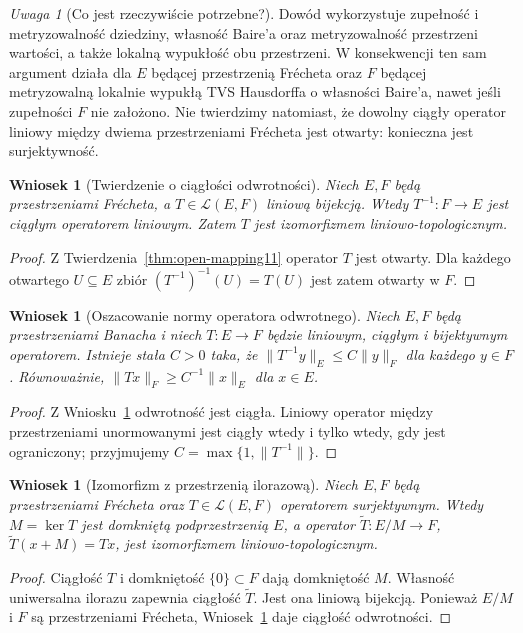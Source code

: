 \documentclass[11pt,a4paper]{article}
\numberwithin{equation}{section}
\theoremstyle{plain}
\newtheorem{wniosek}[twierdzenie]{Wniosek}
\theoremstyle{definition}
\theoremstyle{remark}
\newtheorem{uwaga}[twierdzenie]{Uwaga}
\begin{document}
\begin{uwaga}[Co jest rzeczywiście potrzebne?]\label{rem:open-assumptions11}
Dowód wykorzystuje zupełność i metryzowalność dziedziny,
własność Baire'a oraz metryzowalność przestrzeni wartości,
a także lokalną wypukłość obu przestrzeni. W konsekwencji
ten sam argument działa dla $E$ będącej przestrzenią Frécheta
oraz $F$ będącej metryzowalną lokalnie wypukłą TVS Hausdorffa
o własności Baire'a, nawet jeśli zupełności $F$ nie założono.
Nie twierdzimy natomiast, że dowolny ciągły operator
liniowy między dwiema przestrzeniami Frécheta jest otwarty:
konieczna jest surjektywność.
\end{uwaga}

\begin{wniosek}[Twierdzenie o ciągłości odwrotności]\label{cor:inverse-mapping11}
Niech $E,F$ będą przestrzeniami Frécheta, a
$T\in\mathcal L(E,F)$ liniową bijekcją.
Wtedy $T^{-1}:F\to E$ jest ciągłym operatorem liniowym.
Zatem $T$ jest izomorfizmem liniowo-topologicznym.
\end{wniosek}
\begin{proof}
Z Twierdzenia~\ref{thm:open-mapping11} operator $T$ jest otwarty.
Dla każdego otwartego $U\subseteq E$ zbiór
$(T^{-1})^{-1}(U)=T(U)$ jest zatem otwarty w $F$.
\end{proof}

\begin{wniosek}[Oszacowanie normy operatora odwrotnego]\label{cor:bounded-inverse11}
Niech $E,F$ będą przestrzeniami Banacha i niech
$T:E\to F$ będzie liniowym, ciągłym i bijektywnym
operatorem. Istnieje stała $C>0$ taka, że
$\|T^{-1}y\|_E\le C\|y\|_F$ dla każdego $y\in F$.
Równoważnie, $\|Tx\|_F\ge C^{-1}\|x\|_E$ dla $x\in E$.
\end{wniosek}
\begin{proof}
Z Wniosku~\ref{cor:inverse-mapping11} odwrotność jest ciągła.
Liniowy operator między przestrzeniami unormowanymi jest
ciągły wtedy i tylko wtedy, gdy jest ograniczony; przyjmujemy
$C=\max\{1,\|T^{-1}\|\}$.
\end{proof}

\begin{wniosek}[Izomorfizm z przestrzenią ilorazową]\label{cor:quotient-open11}
Niech $E,F$ będą przestrzeniami Frécheta oraz
$T\in\mathcal L(E,F)$ operatorem surjektywnym.
Wtedy $M=\ker T$ jest domkniętą podprzestrzenią $E$,
a operator
$\widetilde T:E/M\to F$, $\widetilde T(x+M)=Tx$,
jest izomorfizmem liniowo-topologicznym.
\end{wniosek}
\begin{proof}
Ciągłość $T$ i domkniętość $\{0\}\subset F$ dają
domkniętość $M$. Własność uniwersalna ilorazu zapewnia
ciągłość $\widetilde T$. Jest ona liniową bijekcją.
Ponieważ $E/M$ i $F$ są przestrzeniami Frécheta,
Wniosek~\ref{cor:inverse-mapping11} daje ciągłość odwrotności.
\end{proof}
\end{document}
